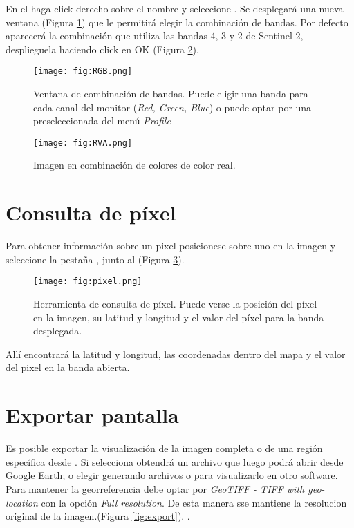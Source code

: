 En el  haga click derecho sobre el nombre y seleccione . Se desplegará una nueva ventana (Figura \ref{fig:RGB}) que le permitirá elegir la combinación de bandas. Por defecto aparecerá la combinación que utiliza las bandas 4, 3 y 2 de Sentinel 2, desplieguela haciendo click en OK (Figura \ref{fig:RVA}).

\begin{figure}[h!]
    \centering
    \texttt{[image: fig:RGB.png]}
    \caption{Ventana de combinación de bandas. Puede eligir una banda para cada canal del monitor (\emph{Red, Green, Blue}) o puede optar por una preseleccionada del menú \emph{Profile}}
    \label{fig:RGB}
\end{figure}

\begin{figure}[h!]
    \centering
    \texttt{[image: fig:RVA.png]}
    \caption{Imagen en combinación de colores de color real.}
    \label{fig:RVA}
\end{figure}


\section{Consulta de píxel}

Para obtener información sobre un pixel posicionese sobre uno en la imagen y seleccione la pestaña , junto al  (Figura \ref{fig:pixel}).

\begin{figure}[h!]
    \centering
    \texttt{[image: fig:pixel.png]}
    \caption{Herramienta de consulta de píxel. Puede verse la posición del píxel en la imagen, su latitud y longitud y el valor del píxel para la banda desplegada.}
    \label{fig:pixel}
\end{figure}

Allí encontrará la latitud y longitud, las coordenadas dentro del mapa y el valor del pixel en la banda abierta.

\section{Exportar pantalla}

Es posible exportar la visualización de la imagen completa o de una región específica desde . Si selecciona  obtendrá un archivo  que luego podrá abrir desde Google Earth; o elegir  generando archivos  o  para visualizarlo en otro software. Para mantener la georreferencia debe optar por \emph{GeoTIFF - TIFF with geo-location} con la opción \emph{Full resolution}. De esta manera sse mantiene la resolucion original de la imagen.(Figura \ref{fig:export}).
.

